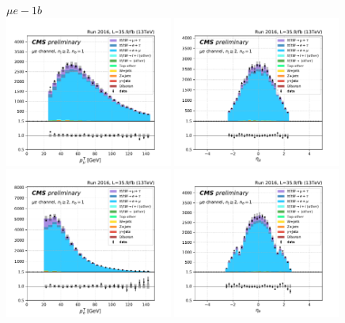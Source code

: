 

\begin{figure}[ht]
    \centering
    $ \mu  e - 1b$ \\
    \includegraphics[width=0.49\textwidth]{chapters/Analysis/sectionPlots/figures/kinematics_pickles/emu/1b/emu_1b_lepton1_pt.pdf}
    \includegraphics[width=0.49\textwidth]{chapters/Analysis/sectionPlots/figures/kinematics_pickles/emu/1b/emu_1b_lepton1_eta.pdf}
    \includegraphics[width=0.49\textwidth]{chapters/Analysis/sectionPlots/figures/kinematics_pickles/emu/1b/emu_1b_lepton2_pt.pdf}
    \includegraphics[width=0.49\textwidth]{chapters/Analysis/sectionPlots/figures/kinematics_pickles/emu/1b/emu_1b_lepton2_eta.pdf}

\end{figure}
